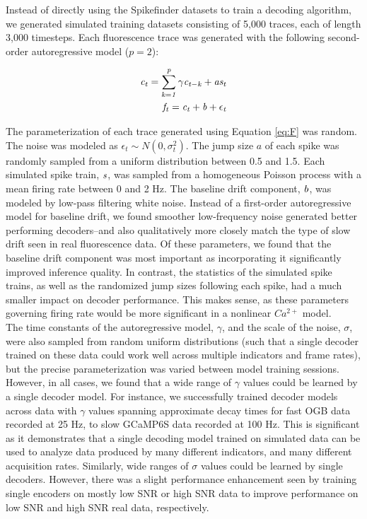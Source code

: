 \documentclass[fleqn,10pt]{wlscirep}
\begin{document}
Instead of directly using the Spikefinder datasets to train a decoding algorithm, we generated simulated training datasets consisting of 5,000 traces, each of length 3,000 timesteps. Each fluorescence trace was generated with the following second-order autoregressive model ($p=2$):

\begin{eqnarray}
	\it{c}_t = \sum_{k=1}^{p}{\gamma c_{t-k} + a \it{s}_t} \label{eq:ar}\\
    \it{f}_t = \it{c}_t + \it{b} + \epsilon_t
    \label{eq:F}
\end{eqnarray}

The parameterization of each trace generated using Equation \ref{eq:F} was random. The noise was modeled as $\epsilon_t \sim N(0, \sigma_t^2)$. The jump size $a$ of each spike was randomly sampled from a uniform distribution between 0.5 and 1.5. Each simulated spike train, $\it{s}$, was sampled from a homogeneous Poisson process with a mean firing rate between 0 and 2 Hz. The baseline drift component, $\it{b}$, was modeled by low-pass filtering white noise. Instead of a first-order autoregressive model for baseline drift\cite{mlspike}, we found smoother low-frequency noise generated better performing decoders--and also qualitatively more closely match the type of slow drift seen in real fluorescence data. Of these parameters, we found that the baseline drift component was most important as incorporating it significantly improved inference quality. In contrast, the statistics of the simulated spike trains, as well as the randomized jump sizes following each spike, had a much smaller impact on decoder performance. This makes sense, as these parameters governing firing rate would be more significant in a nonlinear $Ca^{2+}$ model.\\

The time constants of the autoregressive model, $\gamma$, and the scale of the noise, $\sigma$, were also sampled from random uniform distributions (such that a single decoder trained on these data could work well across multiple indicators and frame rates), but the precise parameterization was varied between model training sessions. However, in all cases, we found that a wide range of $\gamma$ values could be learned by a single decoder model. For instance, we successfully trained decoder models across data with $\gamma$ values spanning approximate decay times for fast OGB data recorded at 25 Hz, to slow GCaMP6S data recorded at 100 Hz. This is significant as it demonstrates that a single decoding model trained on simulated data can be used to analyze data produced by many different indicators, and many different acquisition rates. Similarly, wide ranges of $\sigma$ values could be learned by single decoders. However, there was a slight performance enhancement seen by training single encoders on mostly low SNR or high SNR data to improve performance on low SNR and high SNR real data, respectively. \\
\end{document}
